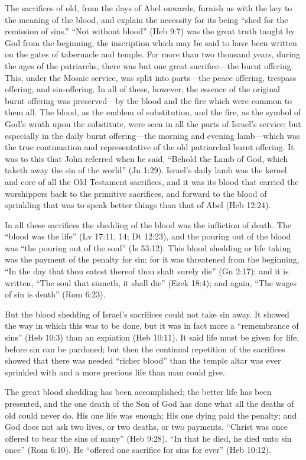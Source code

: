 \documentclass[
]{book}
\begin{document}
The sacrifices of old, from the days of Abel onwards, furnish us with the key to the meaning of the blood, and explain the necessity for its being ``shed for the remission of sins.'' ``Not without blood'' (Heb 9:7) was the great truth taught by God from the beginning; the inscription which may be said to have been written on the gates of tabernacle and temple. For more than two thousand years, during the ages of the patriarchs, there was but one great sacrifice---the burnt offering. This, under the Mosaic service, was split into parts---the peace offering, trespass offering, and sin-offering. In all of these, however, the essence of the original burnt offering was preserved---by the blood and the fire which were common to them all. The blood, as the emblem of substitution, and the fire, as the symbol of God's wrath upon the substitute, were seen in all the parts of Israel's service; but especially in the daily burnt offering---the morning and evening lamb---which was the true continuation and representative of the old patriarchal burnt offering. It was to this that John referred when he said, ``Behold the Lamb of God, which taketh away the sin of the world'' (Jn 1:29). Israel's daily lamb was the kernel and core of all the Old Testament sacrifices, and it was its blood that carried the worshippers back to the primitive sacrifices, and forward to the blood of sprinkling that was to speak better things than that of Abel (Heb 12:24).

In all these sacrifices the shedding of the blood was the infliction of death. The ``blood was the life'' (Lv 17:11, 14; Dt 12:23), and the pouring out of the blood was ``the pouring out of the soul'' (Is 53:12). This blood shedding or life taking was the payment of the penalty for sin; for it was threatened from the beginning, ``In the day that thou eatest thereof thou shalt surely die'' (Gn 2:17); and it is written, ``The soul that sinneth, it shall die'' (Ezek 18:4); and again, ``The wages of sin is death'' (Rom 6:23).

But the blood shedding of Israel's sacrifices could not take sin away. It showed the way in which this was to be done, but it was in fact more a ``remembrance of sins'' (Heb 10:3) than an expiation (Heb 10:11). It said life must be given for life, before sin can be pardoned; but then the continual repetition of the sacrifices showed that there was needed ``richer blood'' than the temple altar was ever sprinkled with and a more precious life than man could give.

The great blood shedding has been accomplished; the better life has been presented, and the one death of the Son of God has done what all the deaths of old could never do. His one life was enough; His one dying paid the penalty; and God does not ask two lives, or two deaths, or two payments. ``Christ was once offered to bear the sins of many'' (Heb 9:28). ``In that he died, he died unto sin once'' (Rom 6:10). He ``offered one sacrifice for sins for ever'' (Heb 10:12).
\end{document}
